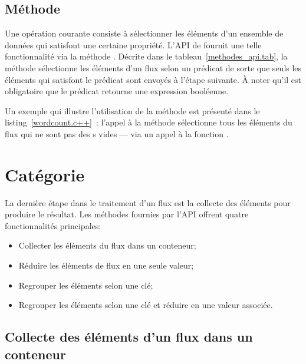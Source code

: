 \subsection{M\'ethode }
Une op\'eration courante consiste \`a s\'electionner les \'el\'ements d'un ensemble de donn\'ees qui satisfont une certaine propri\'et\'e. L'API de  fournit une telle fonctionnalit\'e via la m\'ethode . D\'ecrite dans le tableau~\ref{methodes_api.tab}, la m\'ethode  s\'electionne les \'el\'ements d'un flux selon un pr\'edicat de sorte que seuls les \'el\'ements qui  satisfont le pr\'edicat sont envoy\'es \`a l'\'etape suivante. \`A noter qu'il est obligatoire que le pr\'edicat retourne une expression bool\'eenne. 

Un exemple qui illustre l'utilisation de la m\'ethode  est pr\'esent\'e dans le listing~\ref{wordcount.c++}~: l'appel \`a la m\'ethode   s\'electionne tous les \'el\'ements du flux qui ne sont pas des s vides --- via un appel \`a la fonction .


\section{Cat\'egorie }

\label{aggregation.sect}

La derni\`ere \'etape dans le traitement d'un flux est la collecte des \'el\'ements pour produire le r\'esultat. Les m\'ethodes fournies par l'API offrent quatre fonctionnalit\'es principales: 


\begin{itemize}
	\item Collecter les \'el\'ements du flux dans un conteneur;	

	\item R\'eduire les \'el\'ements de flux en une seule valeur;

	\item Regrouper les \'el\'ements selon une cl\'e;
	
	\item Regrouper les \'el\'ements selon une cl\'e et r\'eduire en une valeur associ\'ee.
\end{itemize}


\subsection{Collecte des \'el\'ements d'un flux dans un conteneur}

